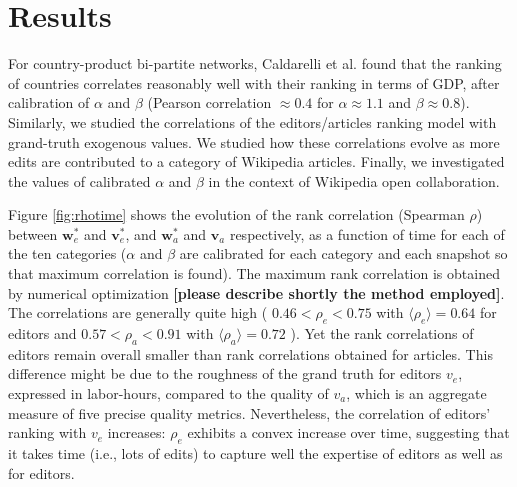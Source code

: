 \section{Results}
For country-product bi-partite networks,  Caldarelli et al. \cite{caldarelli2012network} found that the ranking of countries correlates reasonably well with their ranking in terms of GDP, after calibration of $\alpha$ and $\beta$ (Pearson correlation $\approx 0.4$ for $\alpha \approx 1.1$ and $\beta \approx 0.8$). Similarly, we studied the correlations of the editors/articles ranking model with grand-truth exogenous values. We studied how these correlations evolve as more edits are contributed to a category of Wikipedia articles. Finally, we investigated the values of calibrated $\alpha$ and $\beta$ in the context of Wikipedia open collaboration.

Figure \ref{fig:rhotime} shows the evolution of the rank correlation (Spearman $\rho$) between $\mathbf{w}^*_e$ and $\mathbf{v}^*_e$, and $\mathbf{w}^*_a$ and $\mathbf{v}_a$ respectively, as a function of time for each of the ten categories ($\alpha$ and $\beta$ are calibrated for each category and each snapshot so that maximum correlation is found). The maximum rank correlation is obtained by numerical optimization {\bf [please describe shortly the method employed]}. The correlations are generally quite high ( $ 0.46 < \rho_e < 0.75$ with $\langle \rho_e\rangle = 0.64$ for editors and $0.57 < \rho_a < 0.91$ with $\langle \rho_a\rangle = 0.72$ ). Yet the rank correlations of editors remain overall smaller than rank correlations obtained for articles. This difference might be due to the roughness of the grand truth for editors $v_e$, expressed in labor-hours, compared to the quality of $v_a$, which is an aggregate measure of five precise quality metrics. Nevertheless, the correlation of editors' ranking with $v_e$ increases: $\rho_e$ exhibits a convex increase over time, suggesting that it takes time (i.e., lots of edits) to capture well the expertise of editors as well as for editors. 


